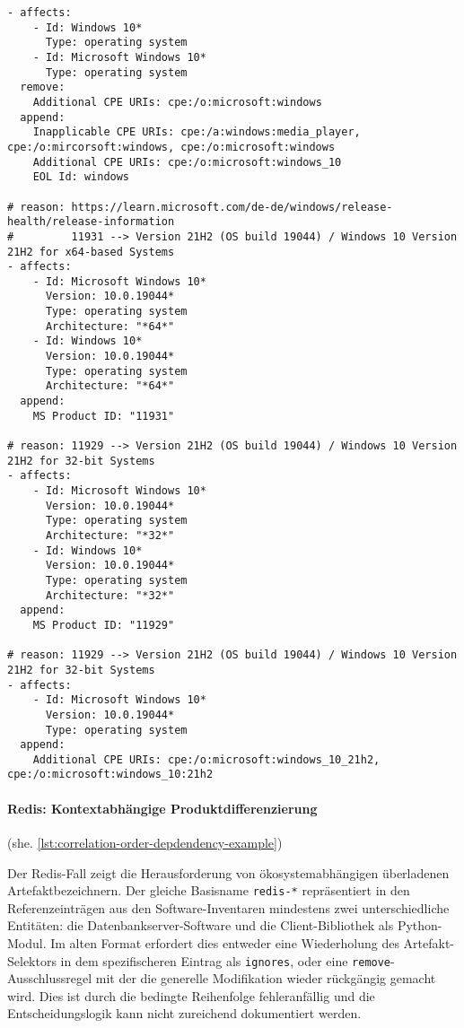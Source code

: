 \begin{lstlisting}[style=yaml,caption={Windows-Korrelation mit mehreren Identifikatoren},label={lst:reference-case-windows},basicstyle=\ttfamily\scriptsize]
- affects:
    - Id: Windows 10*
      Type: operating system
    - Id: Microsoft Windows 10*
      Type: operating system
  remove:
    Additional CPE URIs: cpe:/o:microsoft:windows
  append:
    Inapplicable CPE URIs: cpe:/a:windows:media_player, cpe:/o:mircorsoft:windows, cpe:/o:microsoft:windows
    Additional CPE URIs: cpe:/o:microsoft:windows_10
    EOL Id: windows

# reason: https://learn.microsoft.com/de-de/windows/release-health/release-information
#         11931 --> Version 21H2 (OS build 19044) / Windows 10 Version 21H2 for x64-based Systems
- affects:
    - Id: Microsoft Windows 10*
      Version: 10.0.19044*
      Type: operating system
      Architecture: "*64*"
    - Id: Windows 10*
      Version: 10.0.19044*
      Type: operating system
      Architecture: "*64*"
  append:
    MS Product ID: "11931"

# reason: 11929 --> Version 21H2 (OS build 19044) / Windows 10 Version 21H2 for 32-bit Systems
- affects:
    - Id: Microsoft Windows 10*
      Version: 10.0.19044*
      Type: operating system
      Architecture: "*32*"
    - Id: Windows 10*
      Version: 10.0.19044*
      Type: operating system
      Architecture: "*32*"
  append:
    MS Product ID: "11929"

# reason: 11929 --> Version 21H2 (OS build 19044) / Windows 10 Version 21H2 for 32-bit Systems
- affects:
    - Id: Microsoft Windows 10*
      Version: 10.0.19044*
      Type: operating system
  append:
    Additional CPE URIs: cpe:/o:microsoft:windows_10_21h2, cpe:/o:microsoft:windows_10:21h2
\end{lstlisting}

\paragraph{Redis: Kontextabhängige Produktdifferenzierung}\label{par:reference-case-redis} (she. \autoref{lst:correlation-order-depdendency-example})

Der Redis-Fall zeigt die Herausforderung von ökosystemabhängigen überladenen Artefaktbezeichnern.
Der gleiche Basisname \texttt{redis-*} repräsentiert in den Referenzeinträgen aus den Software-Inventaren mindestens zwei unterschiedliche Entitäten: die Datenbankserver-Software und die Client-Bibliothek als Python-Modul.
Im alten Format erfordert dies entweder eine Wiederholung des Artefakt-Selektors in dem spezifischeren Eintrag als \texttt{ignores}, oder eine \texttt{remove}-Ausschlussregel mit der die generelle Modifikation wieder rückgängig gemacht wird.
Dies ist durch die bedingte Reihenfolge fehleranfällig und die Entscheidungslogik kann nicht zureichend dokumentiert werden.

